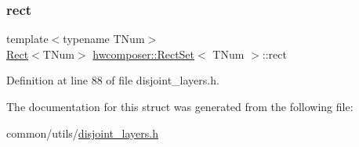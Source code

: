 \mbox{\label{structhwcomposer_1_1RectSet_a7c8d95db3edda0fe888c524886426a2d}} 
\subsubsection{\texorpdfstring{rect}{rect}}
{\footnotesize\ttfamily template$<$typename T\+Num$>$ \\
\mbox{\hyperlink{structhwcomposer_1_1Rect}{Rect}}$<$T\+Num$>$ \mbox{\hyperlink{structhwcomposer_1_1RectSet}{hwcomposer\+::\+Rect\+Set}}$<$ T\+Num $>$\+::rect}



Definition at line 88 of file disjoint\+\_\+layers.\+h.



The documentation for this struct was generated from the following file\+:\begin{DoxyCompactItemize}
\item 
common/utils/\mbox{\hyperlink{disjoint__layers_8h}{disjoint\+\_\+layers.\+h}}\end{DoxyCompactItemize}
